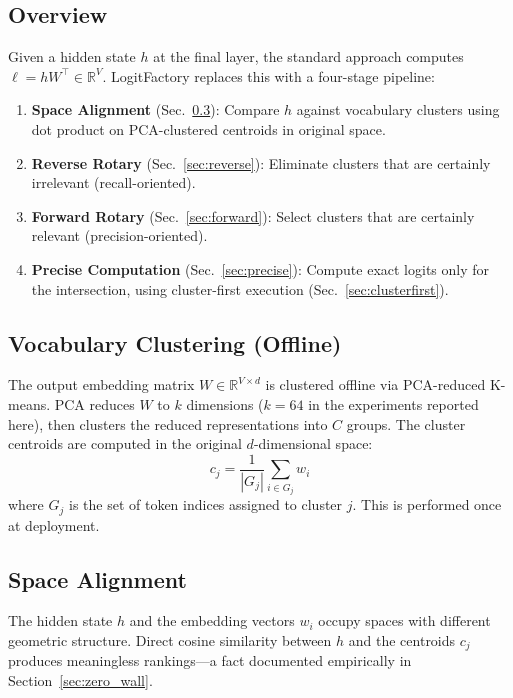 \documentclass[11pt]{article}
\begin{document}
\subsection{Overview}

Given a hidden state $h$ at the final layer, the standard approach computes $\ell = h W^{\top} \in \mathbb{R}^{V}$. LogitFactory replaces this with a four-stage pipeline:

\begin{enumerate}
    \item \textbf{Space Alignment} (Sec.~\ref{sec:alignment}): Compare $h$ against vocabulary clusters using dot product on PCA-clustered centroids in original space.
    \item \textbf{Reverse Rotary} (Sec.~\ref{sec:reverse}): Eliminate clusters that are certainly irrelevant (recall-oriented).
    \item \textbf{Forward Rotary} (Sec.~\ref{sec:forward}): Select clusters that are certainly relevant (precision-oriented).
    \item \textbf{Precise Computation} (Sec.~\ref{sec:precise}): Compute exact logits only for the intersection, using cluster-first execution (Sec.~\ref{sec:clusterfirst}).
\end{enumerate}

\subsection{Vocabulary Clustering (Offline)}

The output embedding matrix $W \in \mathbb{R}^{V \times d}$ is clustered offline via PCA-reduced K-means. PCA reduces $W$ to $k$ dimensions ($k = 64$ in the experiments reported here), then clusters the reduced representations into $C$ groups. The cluster centroids are computed in the original $d$-dimensional space:
\begin{equation}
c_j = \frac{1}{|G_j|} \sum_{i \in G_j} w_i
\end{equation}
where $G_j$ is the set of token indices assigned to cluster $j$. This is performed once at deployment.

\subsection{Space Alignment}\label{sec:alignment}

The hidden state $h$ and the embedding vectors $w_i$ occupy spaces with different geometric structure. Direct cosine similarity between $h$ and the centroids $c_j$ produces meaningless rankings---a fact documented empirically in Section~\ref{sec:zero_wall}.
\end{document}
